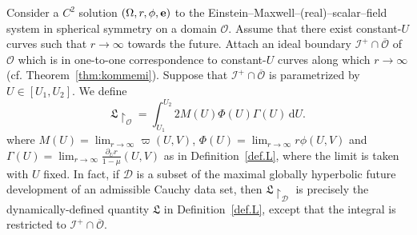 \documentclass[10pt, reqno]{amsart}
\theoremstyle{definition}
\theoremstyle{remark}
\theoremstyle{conjecture}
\numberwithin{equation}{section}
\newcommand{\ud}{\mathrm{d}}
\newcommand{\rd}{\partial}
\newcommand{\0}{\emptyset}
\newcommand{\Gmm}{\Gamma}
\newcommand{\Omg}{\Omega}
\newcommand{\bfe}{{\bf e}}
\newcommand{\calD}{\mathcal D}
\newcommand{\calI}{\mathcal I}
\newcommand{\calO}{\mathcal O}
\newcommand{\e}{\bfe}							%
\newcommand{\NI}{\calI^{+}}						%
\begin{document}
Consider a $C^{2}$ solution $(\Omg, r, \phi, \e)$ to the Einstein--Maxwell--(real)--scalar--field system in spherical symmetry on a domain $\calO$. Assume that there exist constant-$U$ curves such that $r\to \infty$ towards the future. Attach an ideal boundary $\NI \cap \overline{\calO}$ of $\calO$ which is in one-to-one correspondence to constant-$U$ curves along which $r \to \infty$ (cf. Theorem~\ref{thm:kommemi}). Suppose that $\NI \cap \overline{\calO}$ is parametrized by $U \in [U_{1}, U_{2}]$. We define
\begin{equation} \label{eq:L-calD}
	\mathfrak{L} \restriction_{\calO} = \int_{U_{1}}^{U_{2}} 2 M(U) \Phi(U) \Gmm(U) \, \ud U.
\end{equation}
where $M(U) = \lim_{r \to \infty} \varpi(U, V)$, $\Phi(U) = \lim_{r \to \infty} r \phi(U, V)$ and $\Gmm(U) = \lim_{r \to \infty} \frac{\rd_{U} r}{1- \mu}(U, V)$ as in Definition~\ref{def.L}, where the limit is taken with $U$ fixed. In fact, if $\calD$ is a subset of the maximal globally hyperbolic future development of an admissible Cauchy data set, then $\mathfrak{L} \restriction_{\calD}$ is precisely the dynamically-defined quantity $\mathfrak{L}$ in Definition~\ref{def.L}, except that the integral is restricted to $\NI \cap \overline{\calO}$.
\end{document}
